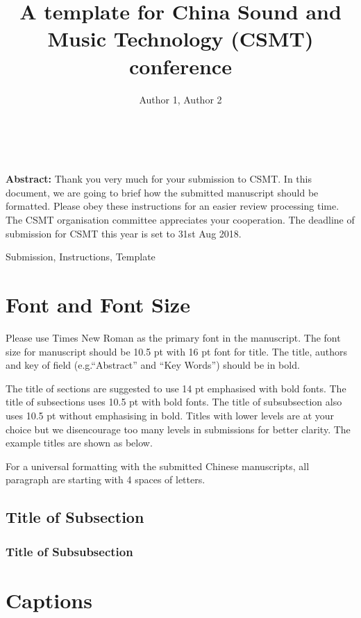 \documentclass[UTF8,a4paper]{article}
\title{A template for China Sound and Music Technology (CSMT) conference}
\author{%
	{Author 1\affmark[1],  Author 2\affmark[2]}\\
	\affaddr{\affmark[1]Affliation 1, City~~Post Code}\\
	\affaddr{\affmark[2]Affliation 2, City~~Post Code}\\
}
\newenvironment{csmtAbstract}{\noindent \kaishu \small {\bfseries Abstract:}}{}
\newenvironment{keywords}{\small \noindent{\bfseries Key Words:}}{}
\begin{document}
\maketitle

\begin{csmtAbstract}
	Thank you very much for your submission to CSMT. In this document, we are going to brief how the submitted manuscript should be formatted. Please obey these instructions for an easier review processing time. The CSMT organisation committee appreciates your cooperation. The deadline of submission for CSMT this year is set to 31st Aug 2018.
\end{csmtAbstract}

\begin{keywords}
	Submission, Instructions, Template
\end{keywords}

\section{Font and Font Size}

Please use Times New Roman as the primary font in the manuscript. The font size for manuscript should be 10.5 pt with 16 pt font for title. The title, authors and key of field (e.g.``Abstract'' and ``Key Words'') should be in bold.

The title of sections are suggested to use 14 pt emphasised with bold fonts. The title of subsections uses 10.5 pt with bold fonts. The title of subsubsection also uses 10.5 pt without emphasising in bold. Titles with lower levels are at your choice but we disencourage too many levels in submissions for better clarity. The example titles are shown as below.

For a universal formatting with the submitted Chinese manuscripts, all paragraph are starting with 4 spaces of letters.

\subsection{Title of Subsection}
\subsubsection{Title of Subsubsection}

\section{Captions}
\end{document}
